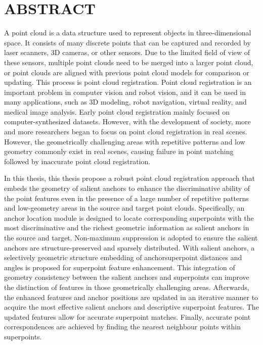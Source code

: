 



\chapter{ABSTRACT}
\xiaosi
A point cloud is a data structure used to represent objects in three-dimensional space. It consists of many discrete points that can be captured and recorded by laser scanners, 3D cameras, or other sensors. Due to the limited field of view of these sensors, multiple point clouds need to be merged into a larger point cloud, or point clouds are aligned with previous point cloud models for comparison or updating. This process is point cloud registration. Point cloud registration is an important problem in computer vision and robot vision, and it can be used in many applications, such as 3D modeling, robot navigation, virtual reality, and medical image analysis. Early point cloud registration mainly focused on computer-synthesized datasets. However, with the development of society, more and more researchers began to focus on point cloud registration in real scenes. However, the geometrically challenging areas with repetitive patterns and low geometry commonly exist in real scenes, causing failure in point matching followed by inaccurate point cloud registration. 

In this thesis, this thesis propose a robust point cloud registration approach that embeds the geometry of salient anchors to enhance the discriminative ability of the point features even in the presence of a large number of repetitive patterns and low-geometry areas in the source and target point clouds. Specifically, an anchor location module is designed to locate corresponding superpoints with the most discriminative and the richest geometric information as salient anchors in the source and target. Non-maximum suppression is adopted to ensure the salient anchors are structure-preserved and sparsely distributed. With salient anchors, a selectively geometric structure embedding of anchorsuperpoint distances and angles is proposed for superpoint feature enhancement. This integration of geometry consistency between the salient anchors and superpoints can improve the distinction of features in those geometrically challenging areas. Afterwards, the enhanced features and anchor positions are updated in an iterative manner to acquire the most effective salient anchors and descriptive superpoint features. The updated features allow for accurate superpoint matches. Finally, accurate point correspondences are achieved by finding the nearest neighbour points within superpoints. 

